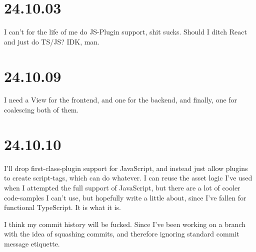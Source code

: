 \section{24.10.03}

I can't for the life of me do JS-Plugin support, shit sucks.
Should I ditch React and just do TS/JS? IDK, man.


\section{24.10.09}

I need a View for the frontend, and one for the backend, and finally, one for
coalescing both of them.


\section{24.10.10}

I'll drop first-class-plugin support for JavaScript, and instead just allow
plugins to create script-tags, which can do whatever. I can reuse the asset
logic I've used when I attempted the full support of JavaScript, but there are
a lot of cooler code-samples I can't use, but hopefully write a little about,
since I've fallen for functional TypeScript. It is what it is.

I think my commit history will be fucked. Since I've been working on a branch
with the idea of squashing commits, and therefore ignoring standard commit
message etiquette.
